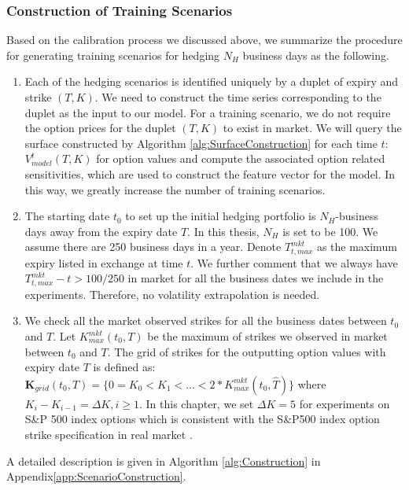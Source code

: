 \documentclass[letterpaper,12pt,titlepage,oneside,final]{book}
\numberwithin{equation}{section}
\theoremstyle{definition}
\begin{document}
\subsubsection{Construction of Training Scenarios}
Based on the calibration process we discussed above, we summarize the procedure for generating training scenarios for hedging $N_H$ business days as the following. \begin{enumerate}
	\item Each of the hedging scenarios is identified uniquely by a duplet of expiry and strike  $(T,K)$. We need to construct the time series corresponding to the duplet as the input to our model. For a training scenario, we do not require the option prices for the  duplet $(T,K)$ to exist in market. We will query the surface constructed by Algorithm \ref{alg:SurfaceConstruction} for each time $t$: $V_{model}^t(T,K)$ for option values and compute the associated option related sensitivities, which are used to construct the feature vector for the model. In this way, we greatly increase the number of training scenarios.  
	\item The starting date $t_0$ to set up the initial hedging portfolio is  $N_H$-business days away from the expiry date $T$. In this thesis,  $N_H$ is set to be 100.  We assume there are 250 business days in a year. Denote $T_{t,max}^{mkt}$ as the maximum expiry listed in exchange at time $t$. We further comment that we always have $T_{t,max}^{mkt}-t>100/250$ in market for all the business dates we include in the experiments.  Therefore, no volatility extrapolation is needed.
	\item We check all the market observed strikes for all the business dates between $t_0$ and  $T$. Let $K^{mkt}_{max}(t_0,T)$ be the maximum of  strikes we observed in market  between $t_0$ and  $T$. The grid of strikes for the outputting option values with expiry date $T$ is defined as: $\mathbf{K}_{grid}(t_0,{T})=\{0=K_0<K_1<\dots<2*K^{mkt}_{max}(t_0,\widehat{T})\}$ where $K_i-K_{i-1}=\Delta K, i \geq 1$. In this chapter, we set $\Delta K=5$ for experiments on S\&P 500 index options which is consistent with the S\&P500 index option strike specification in real market \cite{hull2006options}.
\end{enumerate}
A detailed description is given in Algorithm \ref{alg:Construction} in Appendix\ref{app:ScenarioConstruction}.
\end{document}
